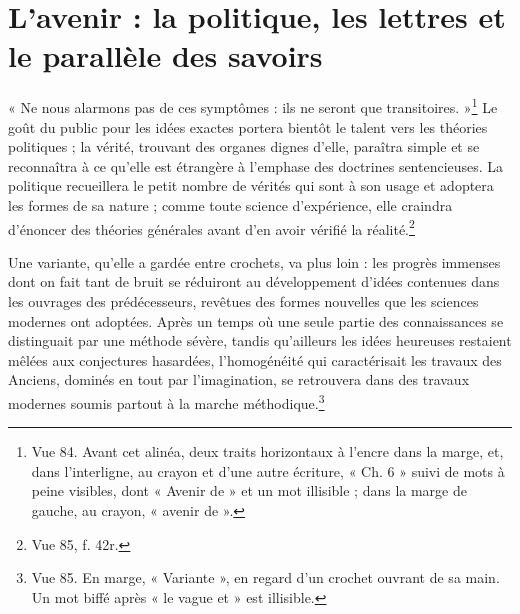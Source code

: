 \documentclass[11pt,a4paper]{article}
\begin{document}
\section*{L'avenir : la politique, les lettres et le parallèle des savoirs}

« Ne nous alarmons pas de ces symptômes : ils ne seront que
transitoires. »\footnote{Vue 84. Avant cet alinéa, deux traits horizontaux à
l'encre dans la marge, et, dans l'interligne, au crayon et d'une autre écriture,
« Ch. 6 » suivi de mots à peine visibles, dont « Avenir de » et un mot
illisible ; dans la marge de gauche, au crayon, « avenir de ».} Le goût du public
pour les idées exactes portera bientôt le talent vers les théories politiques ;
la vérité, trouvant des organes dignes d'elle, paraîtra simple et se reconnaîtra
à ce qu'elle est étrangère à l'emphase des doctrines sentencieuses. La politique
recueillera le petit nombre de vérités qui sont à son usage et adoptera les
formes de sa nature ; comme toute science d'expérience, elle craindra d'énoncer
des théories générales avant d'en avoir vérifié la réalité.\footnote{Vue 85,
f. 42r.}

Une variante, qu'elle a gardée entre crochets, va plus loin : les progrès
immenses dont on fait tant de bruit se réduiront au développement d'idées
contenues dans les ouvrages des prédécesseurs, revêtues des formes nouvelles que
les sciences modernes ont adoptées. Après un temps où une seule partie des
connaissances se distinguait par une méthode sévère, tandis qu'ailleurs les
idées heureuses restaient mêlées aux conjectures hasardées, l'homogénéité qui
caractérisait les travaux des Anciens, dominés en tout par l'imagination, se
retrouvera dans des travaux modernes soumis partout à la marche
méthodique.\footnote{Vue 85. En marge, « Variante », en regard d'un crochet
ouvrant de sa main. Un mot biffé après « le vague et » est illisible.}
\end{document}
